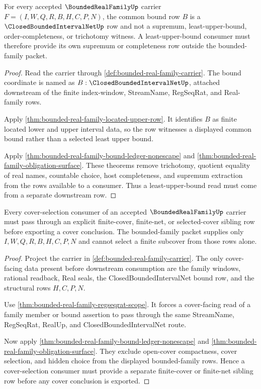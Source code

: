 \begin{theorem}
\label{thm:bounded-real-family-least-upper-bound-refusal}
For every accepted $\BoundedRealFamilyUp$ carrier $F=(I,W,Q,R,B,H,C,P,N)$, the common bound row $B$ is a $\ClosedBoundedIntervalNetUp$ row and not a supremum, least-upper-bound, order-completeness, or trichotomy witness. A least-upper-bound consumer must therefore provide its own supremum or completeness row outside the bounded-family packet.
\end{theorem}
\begin{proof}
Read the carrier through \autoref{def:bounded-real-family-carrier}. The bound coordinate is named as $B:\ClosedBoundedIntervalNetUp$, attached downstream of the finite index-window, StreamName, RegSeqRat, and Real-family rows.

Apply \autoref{thm:bounded-real-family-located-upper-row}. It identifies $B$ as finite located lower and upper interval data, so the row witnesses a displayed common bound rather than a selected least upper bound.

Apply \autoref{thm:bounded-real-family-bound-ledger-nonescape} and \autoref{thm:bounded-real-family-obligation-surface}. These theorems remove trichotomy, quotient equality of real names, countable choice, host completeness, and supremum extraction from the rows available to a consumer. Thus a least-upper-bound read must come from a separate downstream row.
\end{proof}

\begin{theorem}
\label{thm:bounded-real-family-cover-selection-boundary}
Every cover-selection consumer of an accepted $\BoundedRealFamilyUp$ carrier must pass through an explicit finite-cover, finite-net, or selected-cover sibling row before exporting a cover conclusion. The bounded-family packet supplies only $I,W,Q,R,B,H,C,P,N$ and cannot select a finite subcover from those rows alone.
\end{theorem}
\begin{proof}
Project the carrier in \autoref{def:bounded-real-family-carrier}. The only cover-facing data present before downstream consumption are the family windows, rational readback, Real seals, the ClosedBoundedIntervalNet bound row, and the structural rows $H,C,P,N$.

Use \autoref{thm:bounded-real-family-regseqrat-scope}. It forces a cover-facing read of a family member or bound assertion to pass through the same StreamName, RegSeqRat, RealUp, and ClosedBoundedIntervalNet route.

Now apply \autoref{thm:bounded-real-family-bound-ledger-nonescape} and \autoref{thm:bounded-real-family-obligation-surface}. They exclude open-cover compactness, cover selection, and hidden choice from the displayed bounded-family rows. Hence a cover-selection consumer must provide a separate finite-cover or finite-net sibling row before any cover conclusion is exported.
\end{proof}

